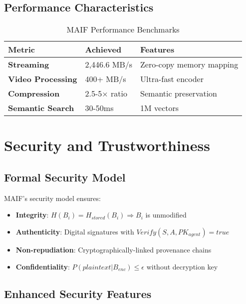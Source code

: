 \documentclass[conference]{IEEEtran}
\begin{document}
\subsection{Performance Characteristics}

\begin{table}[!t]
\renewcommand{\arraystretch}{1.3}
\caption{MAIF Performance Benchmarks}
\label{tab:performance}
\centering
\footnotesize
\begin{tabular}{p{3cm}p{2.5cm}p{2.5cm}}
\toprule
\textbf{Metric} & \textbf{Achieved} & \textbf{Features} \\
\midrule
\textbf{Streaming} & 2,446.6 MB/s & Zero-copy memory mapping \\
\textbf{Video Processing} & 400+ MB/s & Ultra-fast encoder \\
\textbf{Compression} & 2.5-5× ratio & Semantic preservation \\
\textbf{Semantic Search} & 30-50ms & 1M vectors \\
\bottomrule
\end{tabular}
\end{table}

\section{Security and Trustworthiness}

\subsection{Formal Security Model}

MAIF's security model ensures:
\begin{itemize}[leftmargin=*]
\item \textbf{Integrity}: $H(B_i) = H_{stored}(B_i) \Rightarrow B_i$ is unmodified
\item \textbf{Authenticity}: Digital signatures with $Verify(S, A, PK_{agent}) = true$
\item \textbf{Non-repudiation}: Cryptographically-linked provenance chains
\item \textbf{Confidentiality}: $P(plaintext | B_{enc}) \leq \epsilon$ without decryption key
\end{itemize}

\subsection{Enhanced Security Features}
\end{document}
